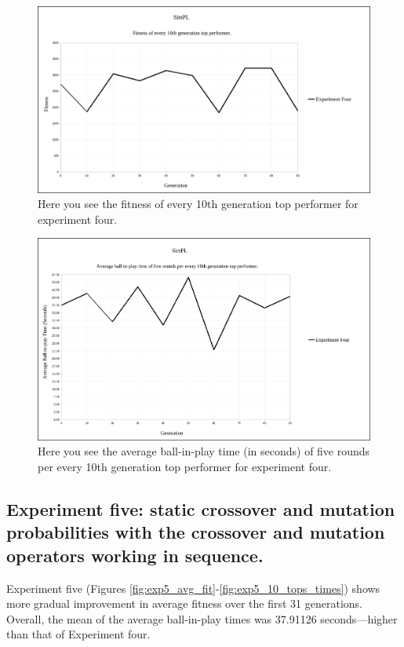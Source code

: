 \documentclass[a4paper,10pt]{article}
\begin{document}
\begin{figure}[H]  
  \centering
  \includegraphics[width=1\textwidth]{figures/exp4_10_tops.png}
  \caption{Here you see the fitness of every 10th generation top performer for experiment four.}
  \label{fig:exp4_10_tops}
\end{figure}

\begin{figure}[H]  
  \centering
  \includegraphics[width=1\textwidth]{figures/exp4_10_tops_times.png}
  \caption{Here you see the average ball-in-play time (in seconds) of five rounds per every 10th generation top performer for experiment four.}
  \label{fig:exp4_10_tops_times}
\end{figure}

\subsection{Experiment five: static crossover and mutation probabilities with the crossover and mutation operators working in sequence.}

Experiment five (Figures \ref{fig:exp5_avg_fit}-\ref{fig:exp5_10_tops_times}) shows more gradual improvement in average fitness over the first 31 generations. Overall, the mean of the average ball-in-play times was 37.91126 seconds---higher than that of Experiment four.
\end{document}
